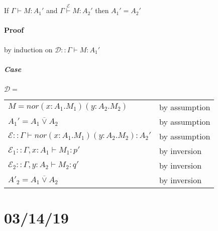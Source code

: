 \documentclass[12 pt]{article}
\begin{document}
       \begin{prooftree}
       \end{prooftree}
       \begin{prooftree}
       \end{prooftree}
       \begin{prooftree}
       \end{prooftree}
       If $\Gamma \vdash M : A_1'$ and $\Gamma \stackrel{\mathcal{E}}{\vdash} M:A_2 '$ then
       $A_1' = A_2'$
       \paragraph{Proof} by induction on $\mathcal{D} :: \Gamma
       \vdash M : A_1'$
       \subparagraph{Case} $\mathcal{D} =$
       \noLine{}
       \noLine{}
       \DP
       \\
       \begin{tabular}{l l}
         $M = nor (x:A_1.M_1)(y:A_2.M_2)$& by assumption
         \\ $A_1' = A_1 \overline{\lor} A_2$ & by assumption
         \\ $\mathcal{E} :: \Gamma \vdash nor(x:A_1.M_1)(y:A_2.M_2) : A_2'$ & by assumption
         \\ $\mathcal{E}_1 :: \Gamma, x:A_1 \vdash M_1 : p'$ & by inversion
         \\ $\mathcal{E}_2 :: \Gamma, y:A_2 \vdash M_2 : q'$ & by inversion
         \\ $A'_2 = A_1 \overline{\lor} A_2$ & by inversion
       \end{tabular}
       \section{03/14/19}
\end{document}
